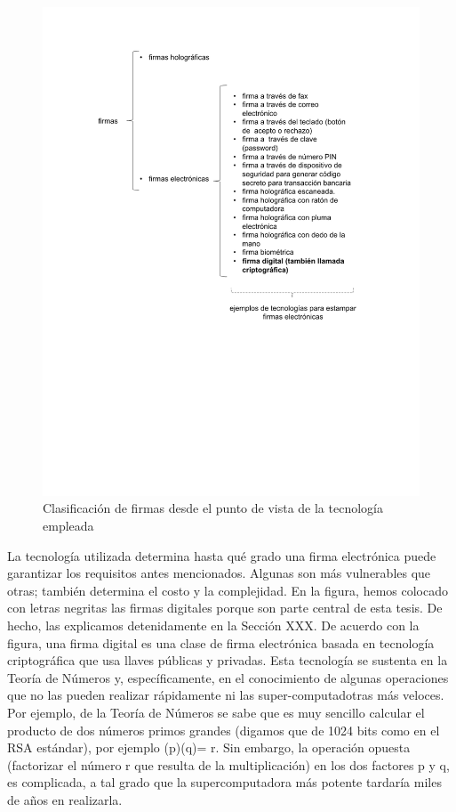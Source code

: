 \documentclass[12pt]{report} %
\begin{document}
\begin{figure}
\centering
\includegraphics[width=0.85\columnwidth]{imagenes/clasesfirmashologyelectro.pdf}
\caption{Clasificación de firmas desde el punto de vista de la tecnología empleada}
\label{Fig. Clases de firmas holografica y electronica}
\end{figure} 

La tecnología utilizada determina hasta qué grado una firma electrónica puede garantizar los requisitos antes mencionados. Algunas son más vulnerables que otras; también determina el costo y la complejidad. En la figura, hemos colocado con letras negritas las firmas digitales porque son parte central de esta tesis. De hecho, las explicamos detenidamente en la Sección XXX. De acuerdo con la figura, una firma digital es una clase de firma electrónica basada en tecnología criptográfica que usa llaves públicas y privadas. Esta tecnología se sustenta en la Teoría de Números y, específicamente, en el conocimiento de algunas operaciones que no las pueden realizar rápidamente ni las super-computadotras más veloces. Por ejemplo, de la Teoría de Números se sabe que es muy sencillo calcular el producto de dos números primos grandes (digamos que de 1024 bits como en el RSA estándar), por ejemplo (p)(q)= r.  Sin embargo, la operación opuesta (factorizar el número r que resulta de la multiplicación) en los dos factores p y q, es complicada, a tal grado que la supercomputadora más potente tardaría miles de años en realizarla.
\end{document}

